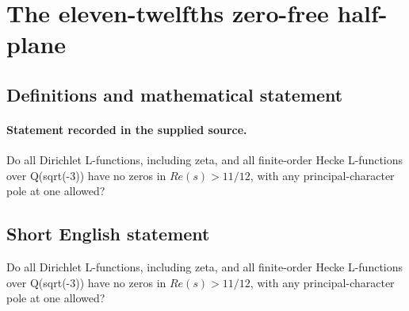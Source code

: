 \documentclass[11pt]{article}
\begin{document}
\section*{The eleven-twelfths zero-free half-plane}\label{statement}
\subsection{Definitions and mathematical statement}
\paragraph{Statement recorded in the supplied source.}
Do all Dirichlet L-functions, including zeta, and all finite-order Hecke L-functions over Q(sqrt(-3)) have no zeros in $Re(s)>11/12$, with any principal-character pole at one allowed?
\subsection{Short English statement}
Do all Dirichlet L-functions, including zeta, and all finite-order Hecke L-functions over Q(sqrt(-3)) have no zeros in $Re(s)>11/12$, with any principal-character pole at one allowed?
\end{document}
